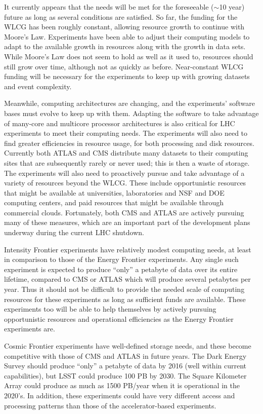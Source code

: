 It currently appears that the needs will be met for the foreseeable ($\sim$10 year) future as long as several conditions are satisfied.  So far, the funding for the WLCG has been roughly constant, allowing resource growth to continue with Moore's Law.  Experiments have been able to adjust their computing models to adapt to the available growth in resources along with the growth in data sets.  While Moore's Law does not seem to hold as well as it used to, resources should still grow over time, although not as quickly as before.  Near-constant WLCG funding will be necessary for the experiments to keep up with growing datasets and event complexity.  

Meanwhile, computing architectures are changing, and the experiments' software bases must evolve to keep up with them.  Adapting the software to take advantage of many-core and multicore processor architectures is also critical for LHC experiments to meet their computing needs.  The experiments will also need to find greater efficiencies in resource usage, for both processing and disk resources.  Currently both ATLAS and CMS distribute many datasets to their computing sites that are subsequently rarely or never used; this is then a waste of storage.  The experiments will also need to proactively pursue and take advantage of a variety of resources beyond the WLCG.  These include opportunistic resources that might be available at universities, laboratories and NSF and DOE computing centers, and paid resources that might be available through commercial clouds.  Fortunately, both CMS and ATLAS are actively pursuing many of these measures, which are an important part of the development plans underway during the current LHC shutdown.

Intensity Frontier experiments have relatively modest computing needs, at least in comparison to those of the Energy Frontier experiments.  Any single such experiment is expected to produce ``only'' a petabyte of data over its entire lifetime, compared to CMS or ATLAS which will produce several petabytes per year.  Thus it should not be difficult to provide the needed scale of computing resources for these experiments as long as sufficient funds are available.  These experiments too will be able to help themselves by actively pursuing opportunistic resources and operational efficiencies as the Energy Frontier experiments are.

Cosmic Frontier experiments have well-defined storage needs, and these become competitive with those of CMS and ATLAS in future years.  The Dark Energy Survey should produce ``only'' a petabyte of data by 2016 (well within current capabilities), but LSST could produce 100 PB by 2030.  The Square Kilometer Array could produce as much as 1500 PB/year when it is operational in the 2020's.  In addition, these experiments could have very different access and processing patterns than those of the accelerator-based experiments.  

